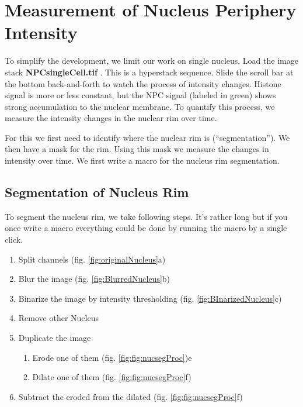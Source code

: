 \section{Measurement of Nucleus Periphery Intensity}

To simplify the development, we limit our work on single nucleus. Load the image stack \textbf{NPCsingleCell.tif} . This is a hyperstack sequence. Slide the scroll bar at the bottom back-and-forth to watch the process of intensity changes. Histone signal is more or less constant, but the NPC signal (labeled in green) shows strong accumulation to the nuclear membrane. To quantify this process, we measure the intensity changes in the nuclear rim over time.

For this we first need to identify where the nuclear rim is (``segmentation''). We then have a mask for the rim. Using this mask we measure the changes in intensity over time. We first write a macro for the nucleus rim segmentation.

\subsection{Segmentation of Nucleus Rim}

To segment the nucleus rim, we take following steps. It's rather long but if you once write a macro everything could be done by running the macro by a single click.

\begin{enumerate}
  \item Split channels (fig. \ref{fig:originalNucleus}a)
  \item Blur the image (fig. \ref{fig:BlurredNucleus}b)
  \item Binarize the image by intensity thresholding (fig. \ref{fig:BInarizedNucleus}c)
  \item Remove other Nucleus
  \item Duplicate the image
  \begin{enumerate}
    \item Erode one of them (fig. \ref{fig:fig:nucsegProc})e
    \item Dilate one of them (fig. \ref{fig:fig:nucsegProc}f)
  \end{enumerate}
  \item Subtract the eroded from the dilated (fig. \ref{fig:fig:nucsegProc}f)
\end{enumerate}